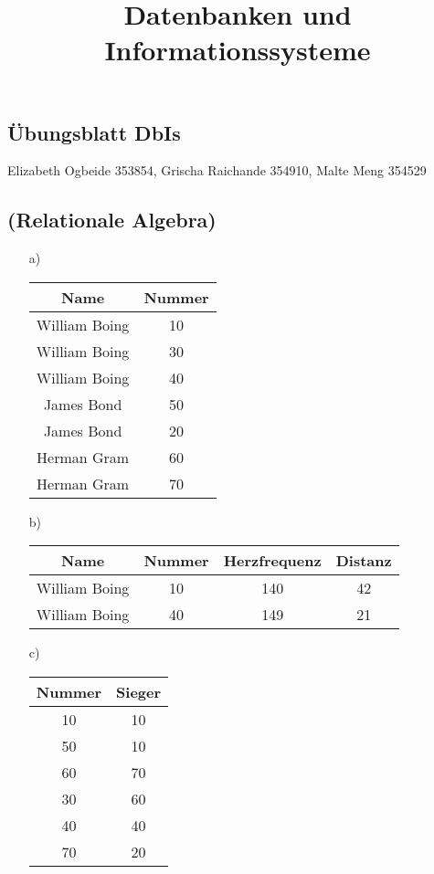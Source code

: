 \documentclass[11pt,a4paper]{article}
\title{Datenbanken und Informationssysteme}
\begin{document}
\begin{center}
\setcounter{section}{2}
\section{\"Ubungsblatt DbIs}

\item{Elizabeth Ogbeide 353854, Grischa Raichande 354910, Malte Meng 354529}
\end{center}
\subsection{(Relationale Algebra)}

\begin{enumerate}
\item[a)] \begin{tabular}{ |c|c| } 
 \hline
 Name & Nummer \\ 
 \hline\hline
 William Boing & 10 \\ 
 \hline
 William Boing & 30 \\ 
 \hline
 William Boing & 40\\
 \hline
 James Bond & 50\\
 \hline
 James Bond & 20\\
 \hline
 Herman Gram & 60\\
 \hline
 Herman Gram & 70\\
 \hline
\end{tabular}

\item[b)] \begin{tabular}{|c|c|c|c|}
\hline
Name & Nummer & Herzfrequenz & Distanz \\
\hline\hline
William Boing & 10 & 140 & 42 \\
\hline
William Boing & 40 & 149 & 21\\
\hline
\end{tabular}

\item[c)] \begin{tabular}{|c|c|}
\hline
Nummer & Sieger\\
\hline\hline
10 & 10\\
\hline
50 & 10\\
\hline
60 & 70\\
\hline
30 & 60\\
\hline
40 & 40\\
\hline 
70 & 20\\
\hline
\end{tabular}


\end{enumerate}
\end{document}
